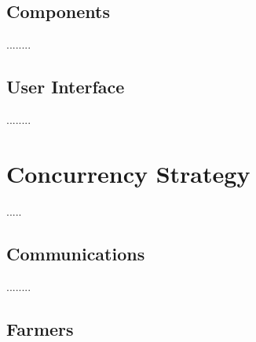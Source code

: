 \documentclass[12pt]{article}
\begin{document}

\subsection{Components} %

........

\subsection{User Interface} %

........

\newpage
\section{Concurrency Strategy} %

.....

\subsection{Communications} %

........

\subsection{Farmers} %
\end{document}
